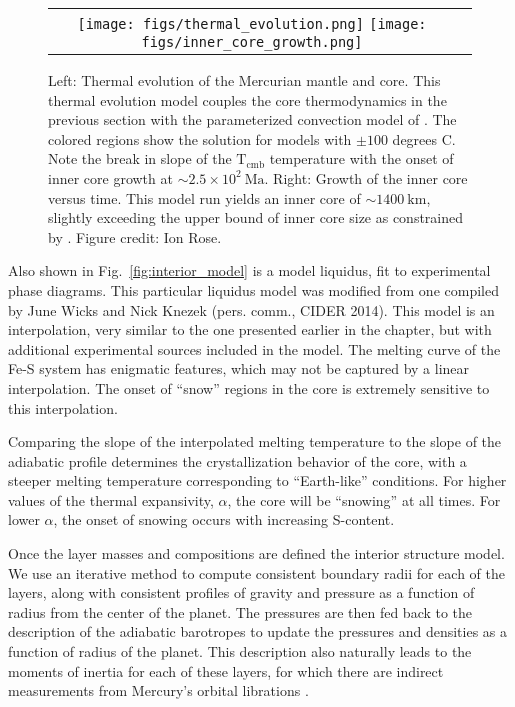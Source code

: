  \begin{figure}[h] %
   \centering
\begin{tabular}{cc}
 \texttt{[image: figs/thermal\_evolution.png]}
 \texttt{[image: figs/inner\_core\_growth.png]}
\end{tabular}
\caption{Left: Thermal evolution of the Mercurian mantle and core. This
  thermal evolution model couples the core thermodynamics in the previous section
  with the parameterized convection model of \citep{Stevenson1983}. The colored
  regions show the solution for models with $\pm \mathrm{100}$ degrees C. Note the
  break in slope of the $\mathrm{T_{cmb}}$ temperature with the onset of inner core
  growth at $\sim 2.5\times10^2~\mathrm{Ma}$. Right: Growth of the inner core versus
  time. This model run yields an inner core of $ \sim 1400~\mathrm{km}$, slightly
  exceeding the upper bound of inner core size as constrained by \citep{Dumberry2015}.
  Figure credit: Ion Rose.}
  \label{fig:thermal}
\end{figure}

Also shown in Fig.~\ref{fig:interior_model} is a model liquidus, fit to experimental
phase diagrams. This particular liquidus model was modified from one compiled by June
Wicks and Nick Knezek (pers. comm., CIDER 2014). This model is an interpolation, very
similar to the one presented earlier in the chapter, but with additional experimental
sources included in the model. The melting curve of the Fe-S system has enigmatic
features, which may not be captured by a  linear interpolation. The onset of ``snow''
regions in the core is extremely sensitive to this interpolation. 

Comparing the slope of the interpolated melting temperature to the slope of the
adiabatic profile determines the crystallization behavior of the core, with a
steeper melting temperature corresponding to  ``Earth-like'' conditions. For higher
values of the thermal expansivity, $\alpha$, the core will be ``snowing'' at all
times. For lower $\alpha$, the onset of snowing occurs with increasing S-content.

Once the layer masses and compositions are defined the interior structure model. We
use an iterative method to compute consistent boundary radii for each of the layers,
along with consistent profiles of gravity and pressure as a function of radius from
the center of the planet. The pressures are then fed back to the description of the
adiabatic barotropes to update the pressures and densities as a function of radius of
the planet. This description also naturally leads to the moments of inertia for each
of these layers, for which there are indirect measurements from Mercury's orbital librations
\citep{Margot2012}.


